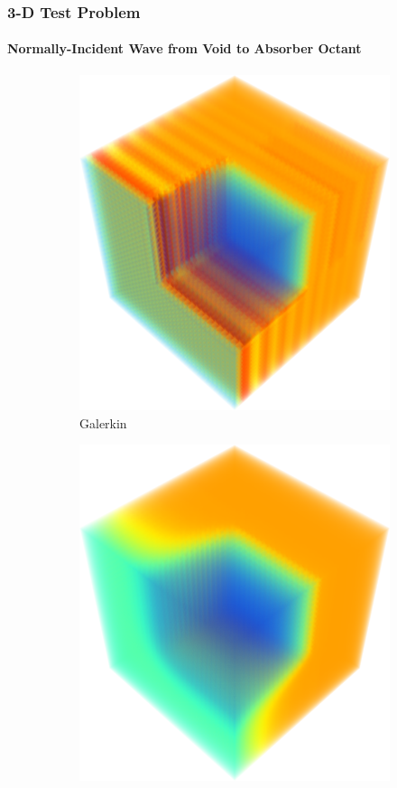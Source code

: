 \documentclass{beamer} \useoutertheme{infolines}
\begin{document}
\begin{frame}
\frametitle{3-D Test Problem}
\framesubtitle{Normally-Incident Wave from Void to Absorber Octant}

\begin{figure}[h]
   \centering
   \begin{subfigure}{0.45\textwidth}
      \includegraphics[width=\textwidth]{./figures/Gal_3D.png}
      \caption{Galerkin}
   \end{subfigure}
   \begin{subfigure}{0.45\textwidth}
      \includegraphics[width=\textwidth]{./figures/GalFCT_3D.png}

\end{subfigure}
\end{figure}
\end{frame}
\end{document}
